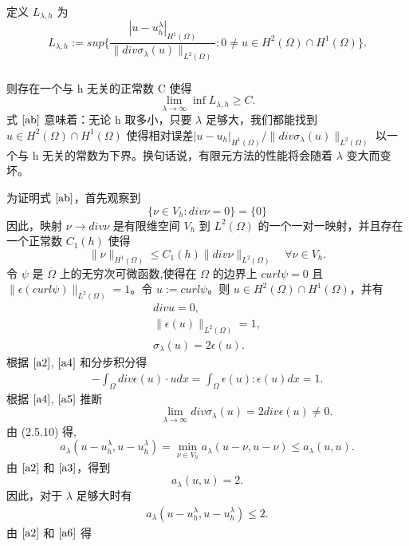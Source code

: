 \documentclass[a4paper,UTF8,titlepage]{ctexart}
\begin{document}
	定义 $L_{\lambda,h}$ 为
	$$
	L_{\lambda,h} := sup \{ \frac{|u-u_h^{\lambda}|_{H^1(\Omega)}}{\| div \sigma_{\lambda}(u) \|_{L^2(\Omega)}} : 0 \ne u \in H^2(\Omega) \cap H^1(\Omega) \}.
	$$
	\\ 
	则存在一个与 h 无关的正常数 C 使得\textsuperscript{\cite{brenner2008mathematical}}
	\begin{equation}
	\lim\limits_{\lambda \to \infty} \inf L_{\lambda,h} \ge C . \label{ab}
	\end{equation}
	式 $\eqref{ab}$ 意味着：无论 h 取多小，只要 $\lambda$ 足够大，我们都能找到 $u \in H^2(\Omega) \cap H^1(\Omega)$ 使得相对误差$ |u-u_h|_{H^1(\Omega)} / \| div \sigma_{\lambda}(u) \|_{L^2(\Omega)} $ 以一个与 h 无关的常数为下界。换句话说，有限元方法的性能将会随着 $\lambda$ 变大而变坏。
	\par
	\iffalse
	为证明式 $\eqref{ab}$，首先观察到
	$$
	\{ \nu \in V_h : div \nu = 0 \} = \{ 0 \}
	$$
	因此，映射 $\nu \to div \nu$ 是有限维空间 $V_h$ 到 $L^2(\Omega)$ 的一个一对一映射，并且存在一个正常数 $C_1(h)$ 使得
	$$
	\| \nu \|_{H^1(\Omega)} \le C_1(h) \| div \nu \|_{L^2(\Omega)} \quad \forall \nu \in V_h.
	$$
	令 $\psi$ 是 $\overline{\Omega}$ 上的无穷次可微函数,使得在 $\Omega$ 的边界上 $curl \psi = 0$ 且 $\| \epsilon(curl \psi) \|_{L^2(\Omega)} = 1$。令 $u := curl \psi$。则 $u \in H^2(\Omega) \cap H^1(\Omega)$，并有
	\begin{align}	
	div u = 0, \label{a2} \\
	\| \epsilon(u) \|_{L^2(\Omega)} = 1, \label{a3}\\
	\sigma_{\lambda}(u) = 2 \epsilon(u).  \label{a4}
	\end{align}
	根据 $\eqref{a2}$, $\eqref{a4}$ 和分步积分得
	\begin{align}
	- \int_{\Omega} div \epsilon(u) \cdot u dx = \int_{\Omega} \epsilon(u) : \epsilon(u) dx = 1. \label{a5}
	\end{align}
	根据 $\eqref{a4}$, $\eqref{a5}$ 推断
	$$
	\quad \quad \quad \quad \quad \quad \quad
	\lim\limits_{\lambda \to \infty} div \sigma_{\lambda}(u) = 2 div \epsilon(u) \ne 0. 
	$$
	由 (2.5.10) 得,
	$$
	a_{\lambda}(u-u_h^{\lambda}, u-u_h^{\lambda}) = \min\limits_{\nu \in V_h} a_{\lambda}(u-\nu,u-\nu) \le a_{\lambda}(u,u).
	$$
	由 $\eqref{a2}$ 和 $\eqref{a3}$，得到
	$$
	a_{\lambda}(u,u) = 2.
	$$
	因此，对于 $\lambda$ 足够大时有
	\begin{align} 
	a_{\lambda} (u-u_h^{\lambda}, u-u_h^{\lambda}) \le 2. \label{a6}
	\end{align}
	由 $\eqref{a2}$ 和 $\eqref{a6}$ 得
	\\
\end{document}
